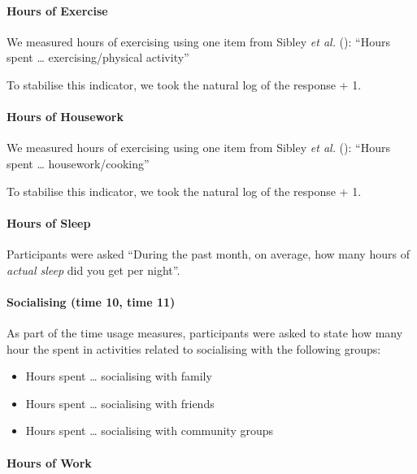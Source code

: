 \documentclass[
  single column]{article}
\let\oldparagraph\paragraph
\renewcommand{\paragraph}[1]{\oldparagraph{#1}\mbox{}}
\providecommand{\tightlist}{%
  \setlength{\itemsep}{0pt}\setlength{\parskip}{0pt}}\usepackage{longtable,booktabs,array}
\begin{document}
\paragraph{Hours of Exercise}\label{hours-of-exercise-1}

We measured hours of exercising using one item from Sibley \emph{et al.}
(): ``Hours spent \ldots{}
exercising/physical activity''

To stabilise this indicator, we took the natural log of the response +
1.

\paragraph{Hours of Housework}\label{hours-of-housework-1}

We measured hours of exercising using one item from Sibley \emph{et al.}
(): ``Hours spent \ldots{}
housework/cooking''

To stabilise this indicator, we took the natural log of the response +
1.

\paragraph{Hours of Sleep}\label{hours-of-sleep}

Participants were asked ``During the past month, on average, how many
hours of \emph{actual sleep} did you get per night''.

\paragraph{Socialising (time 10, time
11)}\label{socialising-time-10-time-11}

As part of the time usage measures, participants were asked to state how
many hour the spent in activities related to socialising with the
following groups:

\begin{itemize}
\tightlist
\item
  Hours spent \ldots{} socialising with family
\item
  Hours spent \ldots{} socialising with friends
\item
  Hours spent \ldots{} socialising with community groups
\end{itemize}

\paragraph{Hours of Work}\label{hours-of-work}
\end{document}
